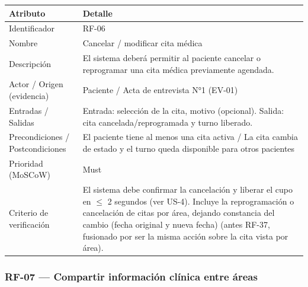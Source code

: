\documentclass[11pt,a4paper]{article}
\begin{document}
	\begin{longtable}{p{} p{}}
		
		\toprule
		\textbf{Atributo} & \textbf{Detalle} \\
		\midrule
		\endhead
		
		Identificador & RF-06 \\
		Nombre & Cancelar / modificar cita médica \\
		Descripción & El sistema deberá permitir al paciente cancelar o reprogramar una cita médica previamente agendada. \\
		Actor / Origen (evidencia) & Paciente / Acta de entrevista N°1 (EV-01) \\
		Entradas / Salidas & Entrada: selección de la cita, motivo (opcional). Salida: cita cancelada/reprogramada y turno liberado. \\
		Precondiciones / Postcondiciones & El paciente tiene al menos una cita activa / La cita cambia de estado y el turno queda disponible para otros pacientes \\
		Prioridad (MoSCoW) & Must \\
		Criterio de verificación & El sistema debe confirmar la cancelación y liberar el cupo en \(\leq\) 2 segundos (ver US-4). Incluye la reprogramación o cancelación de citas por área, dejando constancia del cambio (fecha original y nueva fecha) (antes RF-37, fusionado por ser la misma acción sobre la cita vista por área). \\
		
		\bottomrule
		
	\end{longtable}
	
	\subsubsection{RF-07 --- Compartir información clínica entre áreas}
	
\end{document}
